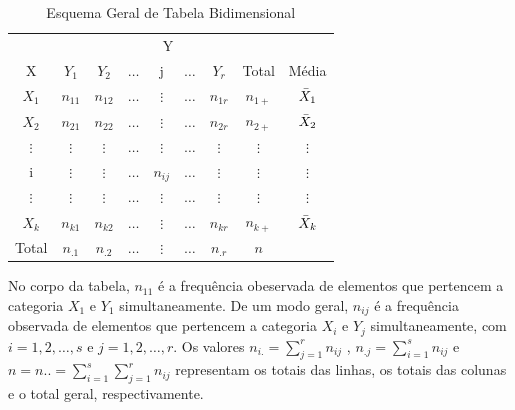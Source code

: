 \begin{table}[!htb]
    \centering
    {
    \caption{Esquema Geral de Tabela Bidimensional}
    \label{Bidimensional}
    \vspace{0.2cm}
\begin{tabular}{c|c|c|c|c|c|c|c|c}
  \hline\hline
                  &  \multicolumn{7}{c}{Y} \\
  \cline{2-9}
  X               & $Y_{1}$     & $Y_{2}$     & $\ldots$  & j        & $\ldots$  & $Y_{r}$  & Total    &  Média \\
  \hline
  $X_{1}$         & $ n_{11}$   & $ n_{12}$   & $\ldots$  & $\vdots$ & $\ldots$  & $n_{1r}$ & $n_{1+}$ & $\Bar{X}_{1}$\\
  $X_{2}$         & $ n_{21}$   & $ n_{22}$   & $\ldots$  & $\vdots$ & $\ldots$  & $n_{2r}$ & $n_{2+}$ & $\Bar{X}_{2}$\\
  $\vdots$        & $\vdots$    & $\vdots$    & $\ldots$  & $\vdots$ & $\ldots$  & $\vdots$ & $\vdots$ & $\vdots$\\
  i               & $\vdots$    & $\vdots$    & $\ldots$  & $n_{ij}$ & $\ldots$  & $\vdots$ & $\vdots$ & $\vdots$  \\
  $\vdots$        & $\vdots$    & $\vdots$    & $\ldots$  & $\vdots$ & $\ldots$  & $\vdots$ & $\vdots$ &  $\vdots$\\
  $X_{k}$         & $ n_{k1}$   & $ n_{k2}$   & $\ldots$  & $\vdots$ & $\ldots$  & $n_{kr}$ & $n_{k+}$ & $\Bar{X}_{k}$ \\
  \hline\hline
  Total              & $n_{.1}$    & $n_{.2}$    & $\ldots$  & $\vdots$ & $\ldots$  & $n_{.r}$ & $n$      & \\
   \hline\hline
\end{tabular}}
\end{table}


No corpo da tabela, $n_{11}$ é a frequência obeservada de
elementos que pertencem a categoria $X_{1}$ e $Y_{1}$
 simultaneamente. De um modo geral, $n_{ij}$ é a frequência observada de elementos que pertencem a categoria
 $X_{i}$ e $Y_{j}$ simultaneamente, com $i=1,2, \ldots,s $ e $j=1,2, \ldots ,r $. Os valores
 $n_{i.}=\sum_{j=1}^{r}n_{ij}$ , $n_{.j}=\sum_{i=1}^{s}n_{ij}$ e $n=n..=\sum_{i=1}^{s}\sum_{j=1}^{r}n_{ij}$
representam os totais das linhas, os totais das colunas e o total
geral, respectivamente.















